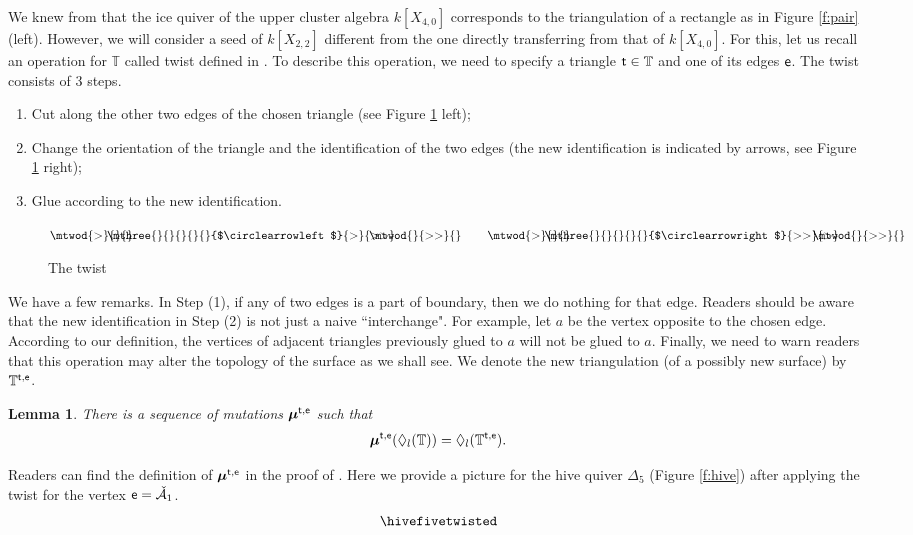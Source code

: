 \documentclass{amsart}
\newtheorem{lemma}[theorem]{Lemma}
\theoremstyle{definition}
\theoremstyle{remark}
\numberwithin{equation}{section}
\newcommand{\mb}[1]{\mathbb{#1}}
\newcommand{\mch}[1]{\check{\mathcal{#1}}}
\newcommand{\bs}[1]{\boldsymbol{#1}}
\newcommand{\e}{{\sf e}}
\renewcommand{\t}{{\sf t}}
\begin{document}
We knew from \cite{FW} that the ice quiver of the upper cluster algebra $k[X_{4,0}]$ corresponds to the triangulation of a rectangle as in Figure \ref{f:pair} (left).
However, we will consider a seed of $k[X_{2,2}]$ different from the one directly transferring from that of $k[X_{4,0}]$.
For this, let us recall an operation for $\mb{T}$ called twist defined in \cite{FW}.
To describe this operation, we need to specify a triangle $\t\in\mb{T}$ and one of its edges $\e$.
The twist consists of 3 steps. \begin{enumerate}
	\item Cut along the other two edges of the chosen triangle (see Figure \ref{f:twist} left); 
	\item Change the orientation of the triangle and the identification of the two edges 
	(the new identification is indicated by arrows, see Figure \ref{f:twist} right);
	\item Glue according to the new identification.
\end{enumerate}
\begin{figure}[!h] $\mtwod{>}{}{} \hspace{-.3in} \mthree{}{}{}{}{}{$\circlearrowleft$}{>}{>>}\hspace{-.3in} \mtwod{}{>>}{}
	\hspace{.3in} \mtwod{>}{}{} \hspace{-.3in} \mthree{}{}{}{}{}{$\circlearrowright$}{>>}{>}\hspace{-.3in} \mtwod{}{>>}{}$ \caption{The twist} \label{f:twist}\end{figure}
We have a few remarks. In Step (1), if any of two edges is a part of boundary, then we do nothing for that edge.
Readers should be aware that the new identification in Step (2) is not just a naive ``interchange".
For example, let $a$ be the vertex opposite to the chosen edge.
According to our definition, the vertices of adjacent triangles previously glued to $a$ will not be glued to $a$.
Finally, we need to warn readers that this operation may alter the topology of the surface as we shall see.
We denote the new triangulation (of a possibly new surface) by $\mb{T}^{\t,\e}$.

\begin{lemma}\cite[Lemma 3.3]{FW} There is a sequence of mutations $\bs{\mu}^{\t,\e}$ such that  
	$$\bs{\mu}^{\t,\e}(\Diamond_l(\mb{T}))=\Diamond_l(\mb{T}^{\t,\e}).$$
\end{lemma}
\noindent Readers can find the definition of $\bs{\mu}^{\t,\e}$ in the proof of \cite[Lemma 3.3]{FW}.
Here we provide a picture for the hive quiver $\Delta_5$ (Figure \ref{f:hive}) after applying the twist for the vertex $\e = \mch{A}_1$.
$$\hivefivetwisted$$
\end{document}
